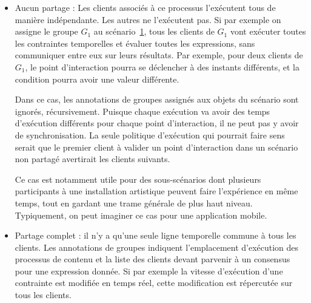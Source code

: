 \documentclass{article}
\newcommand\trigger{point d'interaction\xspace}
\begin{document}
\begin{itemize}
    \item Aucun partage : Les clients associés à ce processus l'exécutent tous de manière indépendante.
    Les autres ne l'exécutent pas. 
    Si par exemple on assigne le groupe $G_1$ au scénario~\ref{scenar.general}, tous les clients de $G_1$ vont exécuter toutes les contraintes temporelles et évaluer toutes les expressions, sans communiquer entre eux sur leurs résultats. 
    Par exemple, pour deux clients de $G_1$, le \trigger pourra se déclencher à des instants différents, et la condition pourra avoir une valeur différente.
    
    Dans ce cas, les annotations de groupes assignés aux objets du scénario sont ignorés, récursivement. 
    Puisque chaque exécution va avoir des temps d'exécution différents pour chaque point d'interaction, il ne peut pas y avoir de synchronisation.
    La seule politique d'exécution qui pourrait faire sens serait que le premier client à valider un \trigger dans un scénario non partagé avertirait les clients suivants.
    
    Ce cas est notamment utile pour des sous-scénarios dont plusieurs participants à une installation artistique peuvent faire l'expérience en même temps, tout en gardant une trame générale de plus haut niveau. 
    Typiquement, on peut imaginer ce cas pour une application mobile.
    
    \begin{figure}[h]
        \centering
        \begin{tikzpicture}
        
        \end{tikzpicture}
        \label{scenar.general}
    \end{figure}
    
    \item Partage complet : il n'y a qu'une seule ligne temporelle commune à tous les clients. 
    Les annotations de groupes indiquent l'emplacement d'exécution des processus de contenu et la liste des clients devant parvenir à un consensus pour une expression donnée. 
    Si par exemple la vitesse d'exécution d'une contrainte est modifiée en temps réel, cette modification est répercutée sur tous les clients.
    

\end{itemize}
\end{document}
